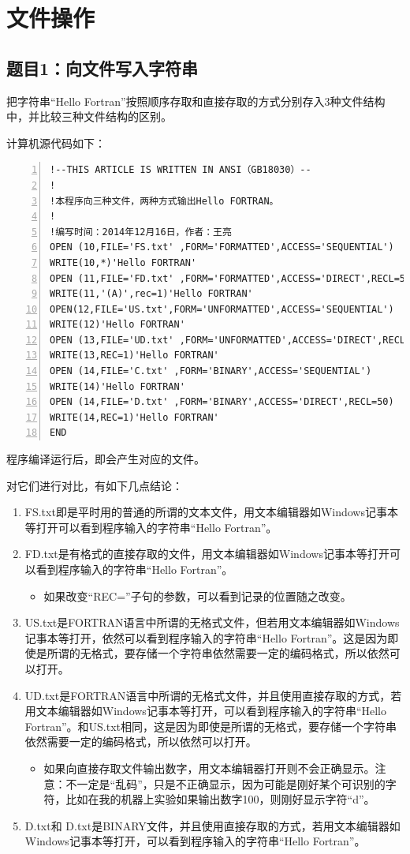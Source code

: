 \documentclass[hyperref,UTF-8]{ctexart}
\begin{document}
\section{文件操作}
\subsection{题目1：向文件写入字符串}
把字符串“Hello Fortran”按照顺序存取和直接存取的方式分别存入3种文件结构中，并比较三种文件结构的区别。

计算机源代码如下：
\begin{Verbatim}[numbers=left,commandchars=\\\{\},fontsize=\small]
!--THIS ARTICLE IS WRITTEN IN ANSI（GB18030）--
!
!本程序向三种文件，两种方式输出Hello FORTRAN。
!
!编写时间：2014年12月16日，作者：王亮
OPEN (10,FILE='FS.txt' ,FORM='FORMATTED',ACCESS='SEQUENTIAL') 
WRITE(10,*)'Hello FORTRAN'
OPEN (11,FILE='FD.txt' ,FORM='FORMATTED',ACCESS='DIRECT',RECL=50) 
WRITE(11,'(A)',rec=1)'Hello FORTRAN'
OPEN(12,FILE='US.txt',FORM='UNFORMATTED',ACCESS='SEQUENTIAL')
WRITE(12)'Hello FORTRAN'
OPEN (13,FILE='UD.txt' ,FORM='UNFORMATTED',ACCESS='DIRECT',RECL=50) 
WRITE(13,REC=1)'Hello FORTRAN'
OPEN (14,FILE='C.txt' ,FORM='BINARY',ACCESS='SEQUENTIAL') 
WRITE(14)'Hello FORTRAN'
OPEN (14,FILE='D.txt' ,FORM='BINARY',ACCESS='DIRECT',RECL=50) 
WRITE(14,REC=1)'Hello FORTRAN'
END
\end{Verbatim}

程序编译运行后，即会产生对应的文件。

\noindent
对它们进行对比，有如下几点结论：
\begin{enumerate}
\item FS.txt即是平时用的普通的所谓的文本文件，用文本编辑器如Windows记事本等打开可以看到程序输入的字符串“Hello Fortran”。
\item FD.txt是有格式的直接存取的文件，用文本编辑器如Windows记事本等打开可以看到程序输入的字符串“Hello Fortran”。
\begin{itemize}
\item 如果改变“REC=”子句的参数，可以看到记录的位置随之改变。
\end{itemize}
\item  US.txt是FORTRAN语言中所谓的无格式文件，但若用文本编辑器如Windows记事本等打开，依然可以看到程序输入的字符串“Hello Fortran”。这是因为即使是所谓的无格式，要存储一个字符串依然需要一定的编码格式，所以依然可以打开。
\item  UD.txt是FORTRAN语言中所谓的无格式文件，并且使用直接存取的方式，若用文本编辑器如Windows记事本等打开，可以看到程序输入的字符串“Hello Fortran”。和US.txt相同，这是因为即使是所谓的无格式，要存储一个字符串依然需要一定的编码格式，所以依然可以打开。
\begin{itemize}
\item 如果向直接存取文件输出数字，用文本编辑器打开则不会正确显示。注意：不一定是“乱码”，只是不正确显示，因为可能是刚好某个可识别的字符，比如在我的机器上实验如果输出数字100，则刚好显示字符“d”。
\end{itemize}
\item  D.txt和 D.txt是BINARY文件，并且使用直接存取的方式，若用文本编辑器如Windows记事本等打开，可以看到程序输入的字符串“Hello Fortran”。
\end{enumerate}
\end{document}
